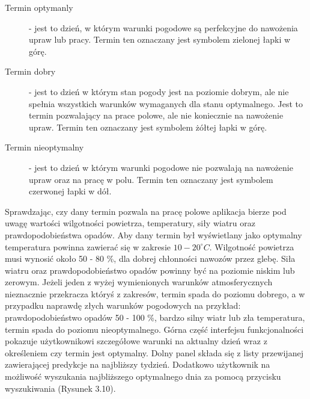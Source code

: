 \documentclass[a4paper,12pt,oneside]{book}
\begin{document}
		\begin{description}
			\item[Termin optymanly] - jest to dzień, w którym warunki pogodowe są perfekcyjne do nawożenia upraw lub pracy. Termin ten oznaczany jest symbolem zielonej łapki w górę.
			\item[Termin dobry] - jest to dzień w którym stan pogody jest na poziomie dobrym, ale nie spełnia wszystkich warunków wymaganych dla stanu optymalnego. Jest to termin pozwalający na prace polowe, ale nie koniecznie na nawożenie upraw. Termin ten oznaczany jest symbolem żółtej łapki w górę.
			\item[Termin nieoptymalny] - jest to dzień w którym warunki pogodowe nie pozwalają na nawożenie upraw oraz na pracę w polu. Termin ten oznaczany jest symbolem czerwonej łapki w dół.
		\end{description}
	
		Sprawdzając, czy dany termin pozwala na pracę polowe aplikacja bierze pod uwagę wartości wilgotności powietrza, temperatury, siły wiatru oraz prawdopodobieństwa opadów. Aby dany termin był wyświetlany jako optymalny temperatura powinna zawierać się w zakresie $10-20^{\circ} C$. Wilgotność powietrza musi wynosić około 50 - 80 \%, dla dobrej chłonności nawozów przez glebę. Siła wiatru oraz prawdopodobieństwo opadów powinny być na poziomie niskim lub zerowym. Jeżeli jeden z wyżej wymienionych warunków atmosferycznych nieznacznie przekracza któryś z zakresów, termin spada do poziomu dobrego, a w przypadku naprawdę złych warunków pogodowych na przykład: prawdopodobieństwo opadów 50 - 100 \%, bardzo silny wiatr lub zła temperatura, termin spada do poziomu nieoptymalnego. Górna część interfejsu funkcjonalności pokazuje użytkownikowi szczegółowe warunki na aktualny dzień wraz z określeniem czy termin jest optymalny. Dolny panel składa się z listy przewijanej zawierającej predykcje na najbliższy tydzień. Dodatkowo użytkownik na możliwość wyszukania najbliższego optymalnego dnia za pomocą przycisku wyszukiwania (Rysunek 3.10).
		
\end{document}
